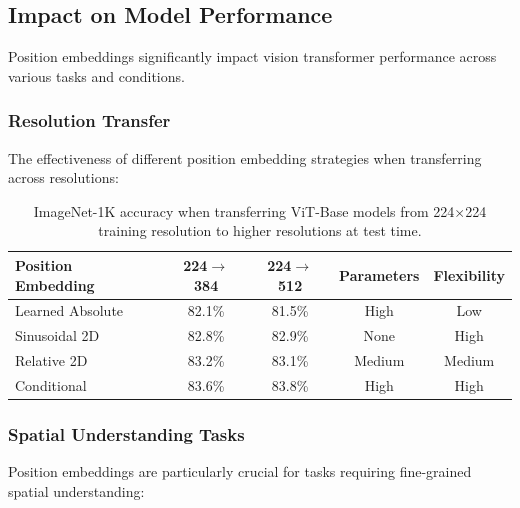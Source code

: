 \subsection{Impact on Model Performance}

Position embeddings significantly impact vision transformer performance across various tasks and conditions.

\subsubsection{Resolution Transfer}

The effectiveness of different position embedding strategies when transferring across resolutions:

\begin{table}[htbp]
\centering
\begin{tabular}{lcccc}
\toprule
\textbf{Position Embedding} & \textbf{224$\rightarrow$384} & \textbf{224$\rightarrow$512} & \textbf{Parameters} & \textbf{Flexibility} \\
\midrule
Learned Absolute & 82.1\% & 81.5\% & High & Low \\
Sinusoidal 2D & 82.8\% & 82.9\% & None & High \\
Relative 2D & 83.2\% & 83.1\% & Medium & Medium \\
Conditional & 83.6\% & 83.8\% & High & High \\
\bottomrule
\end{tabular}
\caption{ImageNet-1K accuracy when transferring ViT-Base models from 224$\times$224 training resolution to higher resolutions at test time.}

\end{table}

\subsubsection{Spatial Understanding Tasks}

Position embeddings are particularly crucial for tasks requiring fine-grained spatial understanding:

